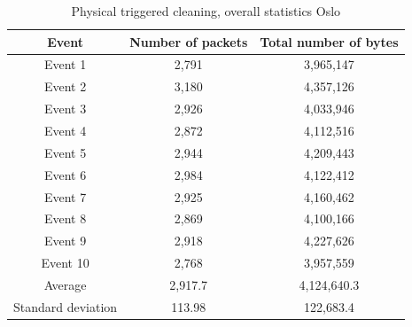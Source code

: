 \begin{table}[H]
\centering
\caption{Physical triggered cleaning, overall statistics Oslo}
\label{tab:PCoverallOSL}
\begin{tabular}{|c|c|c|}
\hline
\textbf{Event} & \textbf{Number of packets} & \textbf{Total number of bytes} \\ \hline
Event 1        & 2,791                   & 3,965,147                   \\ \hline
Event 2        & 3,180                   & 4,357,126                   \\ \hline
Event 3        & 2,926                   & 4,033,946                   \\ \hline
Event 4        & 2,872                   & 4,112,516                   \\ \hline
Event 5        & 2,944                   & 4,209,443                   \\ \hline
Event 6        & 2,984                   & 4,122,412                   \\ \hline
Event 7        & 2,925                   & 4,160,462                   \\ \hline
Event 8        & 2,869                   & 4,100,166                   \\ \hline
Event 9        & 2,918                   & 4,227,626                   \\ \hline
Event 10       & 2,768                   & 3,957,559                   \\ \hline
Average        & 2,917.7                 & 4,124,640.3                 \\ \hline
Standard deviation        & 113.98
       & 122,683.4               \\ \hline
\end{tabular}
\end{table}

